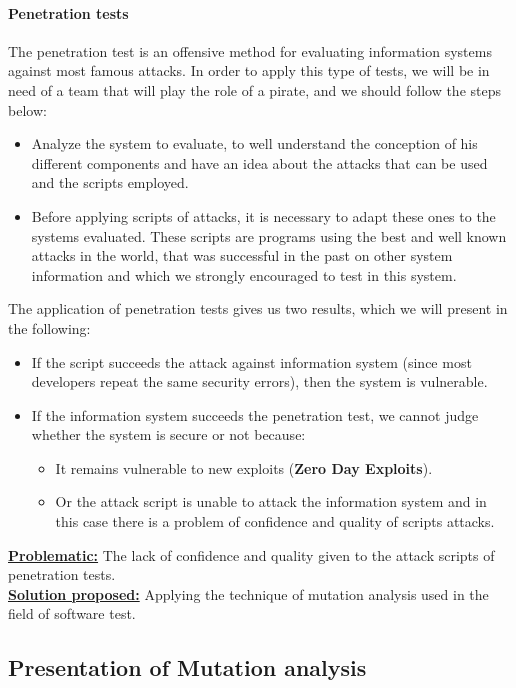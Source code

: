 \documentclass{acm_proc_article-sp}
\begin{document}
\paragraph{Penetration tests}
The penetration test \cite{DBLP:journals/ieeesp/ArkinSM05} is an offensive method for evaluating information systems against most famous attacks. In order to apply this type of tests, we will be in need of a team that will play the role of a pirate, and we should follow the steps below:
\begin{itemize}
\item Analyze the system to evaluate, to well understand the conception of his different components and have an idea about the attacks that can be used and the scripts employed.
\item Before applying scripts of attacks, it is necessary to adapt these ones to the systems evaluated. These scripts are programs using the best and well known attacks in the world, that was successful in the past on other system information and which we strongly encouraged to test in this system.
\end{itemize}

The application of penetration tests gives us two results, which we will present in the following:
\begin{itemize}
\item If the script succeeds the attack against information system (since most developers repeat the same security errors), then the system is vulnerable.
\item If the information system succeeds the penetration test, we cannot judge whether the system is secure or not because:
\begin{itemize}
\item It remains vulnerable to new exploits (\textbf{Zero Day Exploits}).
\item Or the attack script is unable to attack the information system and in this case there is a problem of confidence and quality of scripts attacks.
\end{itemize}
\end{itemize}

\textbf{\underline{Problematic:}} The lack of confidence and quality given to the attack scripts of penetration tests.\\
\textbf{\underline{Solution proposed:}} Applying the technique of mutation analysis used in the field of software test.


\subsection{Presentation of Mutation analysis}
\end{document}
